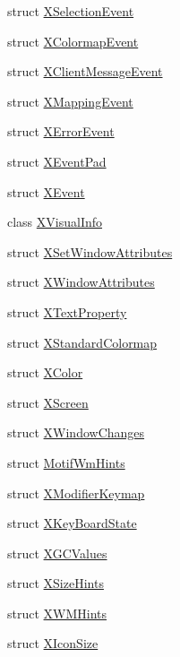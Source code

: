\begin{DoxyCompactItemize}
\item 
struct \hyperlink{struct_tao_1_1_platform_1_1_x11_1_1_x_selection_event}{XSelectionEvent}
\item 
struct \hyperlink{struct_tao_1_1_platform_1_1_x11_1_1_x_colormap_event}{XColormapEvent}
\item 
struct \hyperlink{struct_tao_1_1_platform_1_1_x11_1_1_x_client_message_event}{XClientMessageEvent}
\item 
struct \hyperlink{struct_tao_1_1_platform_1_1_x11_1_1_x_mapping_event}{XMappingEvent}
\item 
struct \hyperlink{struct_tao_1_1_platform_1_1_x11_1_1_x_error_event}{XErrorEvent}
\item 
struct \hyperlink{struct_tao_1_1_platform_1_1_x11_1_1_x_event_pad}{XEventPad}
\item 
struct \hyperlink{struct_tao_1_1_platform_1_1_x11_1_1_x_event}{XEvent}
\item 
class \hyperlink{class_tao_1_1_platform_1_1_x11_1_1_x_visual_info}{XVisualInfo}
\item 
struct \hyperlink{struct_tao_1_1_platform_1_1_x11_1_1_x_set_window_attributes}{XSetWindowAttributes}
\item 
struct \hyperlink{struct_tao_1_1_platform_1_1_x11_1_1_x_window_attributes}{XWindowAttributes}
\item 
struct \hyperlink{struct_tao_1_1_platform_1_1_x11_1_1_x_text_property}{XTextProperty}
\item 
struct \hyperlink{struct_tao_1_1_platform_1_1_x11_1_1_x_standard_colormap}{XStandardColormap}
\item 
struct \hyperlink{struct_tao_1_1_platform_1_1_x11_1_1_x_color}{XColor}
\item 
struct \hyperlink{struct_tao_1_1_platform_1_1_x11_1_1_x_screen}{XScreen}
\item 
struct \hyperlink{struct_tao_1_1_platform_1_1_x11_1_1_x_window_changes}{XWindowChanges}
\item 
struct \hyperlink{struct_tao_1_1_platform_1_1_x11_1_1_motif_wm_hints}{MotifWmHints}
\item 
struct \hyperlink{struct_tao_1_1_platform_1_1_x11_1_1_x_modifier_keymap}{XModifierKeymap}
\item 
struct \hyperlink{struct_tao_1_1_platform_1_1_x11_1_1_x_key_board_state}{XKeyBoardState}
\item 
struct \hyperlink{struct_tao_1_1_platform_1_1_x11_1_1_x_g_c_values}{XGCValues}
\item 
struct \hyperlink{struct_tao_1_1_platform_1_1_x11_1_1_x_size_hints}{XSizeHints}
\item 
struct \hyperlink{struct_tao_1_1_platform_1_1_x11_1_1_x_w_m_hints}{XWMHints}
\item 
struct \hyperlink{struct_tao_1_1_platform_1_1_x11_1_1_x_icon_size}{XIconSize}
\end{DoxyCompactItemize}
